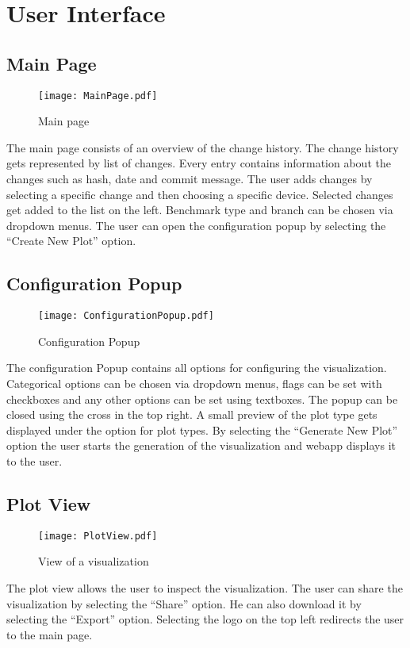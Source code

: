 \section{User Interface}

\subsection{Main Page}

\begin{figure}[H]
    \texttt{[image: MainPage.pdf]}
    \caption{Main page}
    \label{ui:main}
\end{figure}

The main page consists of an overview of the change history. The change history gets represented by list of changes. Every entry contains information about the changes such as hash, date and commit message. The user adds changes by selecting a specific change and then choosing a specific device. Selected changes get added to the list on the left. Benchmark type and branch can be chosen via dropdown menus. The user can open the configuration popup by selecting the \enquote{Create New Plot} option.

\subsection{Configuration Popup}

\begin{figure}[H]
    \texttt{[image: ConfigurationPopup.pdf]}
    \caption{Configuration Popup}
    \label{ui:config}
\end{figure}

The configuration Popup contains all options for configuring the \gls{visualization}. Categorical options can be chosen via dropdown menus, flags can be set with checkboxes and any other options can be set using textboxes. The popup can be closed using the cross in the top right. A small preview of the plot type gets displayed under the option for plot types. By selecting the \enquote{Generate New Plot} option the user starts the generation of the \gls{visualization} and webapp displays it to the user.

\subsection{Plot View}

\begin{figure}[H]
    \texttt{[image: PlotView.pdf]}
    \caption{View of a \gls{visualization}}
    \label{ui:plot}
\end{figure}

The plot view allows the user to inspect the \gls{visualization}. The user can share the \gls{visualization} by selecting the \enquote{Share} option. He can also download it by selecting the \enquote{Export} option. Selecting the logo on the top left redirects the user to the main page.
